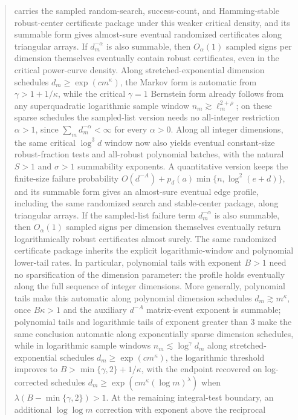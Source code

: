 \documentclass[11pt]{amsart}
\numberwithin{equation}{section}
\theoremstyle{definition}
\theoremstyle{remark}
\begin{document}
\begin{abstract}
carries the sampled random-search, success-count, and Hamming-stable
robust-center certificate package under this weaker critical density, and its
summable form gives almost-sure eventual randomized certificates along triangular
arrays.  If \(d_m^{-\alpha}\) is also summable, then \(O_\alpha(1)\) sampled
signs per dimension themselves eventually contain robust certificates, even in
the critical power-curve density.  Along stretched-exponential dimension
schedules \(d_m\ge\exp(c m^\kappa)\),
the Markov form is automatic from \(\gamma>1+1/\kappa\), while the critical
\(\gamma=1\) Bernstein form already follows from any superquadratic logarithmic
sample window \(n_m\gtrsim \ell_m^{2+\rho}\); on these sparse schedules the
sampled-list version needs no all-integer restriction \(\alpha>1\), since
\(\sum_m d_m^{-\alpha}<\infty\) for every \(\alpha>0\).  Along all integer
dimensions, the same critical \(\log^3 d\) window now also yields eventual
constant-size robust-fraction tests and all-robust polynomial batches, with the
natural \(S>1\) and \(\sigma>1\) summability exponents.  A quantitative version keeps the finite-size
failure probability \(O(d^{-A})+p_d(a)\min\{n,\log^2(e+d)\}\), and its summable
form gives an almost-sure eventual edge profile, including the same randomized
search and stable-center package, along triangular arrays.  If the sampled-list
failure term \(d_m^{-\alpha}\) is also summable, then \(O_\alpha(1)\) sampled
signs per dimension themselves eventually return logarithmically robust
certificates almost surely.  The same randomized certificate package inherits
the explicit logarithmic-window and polynomial lower-tail rates.  In particular,
polynomial tails with exponent \(B>1\) need no sparsification of the dimension
parameter: the profile holds eventually along the full sequence of integer
dimensions.  More generally, polynomial tails make this automatic along
polynomial dimension schedules \(d_m\gtrsim m^\kappa\), once \(B\kappa>1\) and
the auxiliary \(d^{-A}\) matrix-event exponent is summable; polynomial tails and
logarithmic tails of exponent greater than \(3\) make the same conclusion automatic along
exponentially sparse dimension schedules, while in
logarithmic sample windows \(n_m\lesssim\log^\gamma d_m\) along
stretched-exponential schedules \(d_m\ge \exp(c m^\kappa)\), the logarithmic
threshold improves to \(B>\min\{\gamma,2\}+1/\kappa\), with the endpoint
recovered on log-corrected schedules
\(d_m\ge\exp(c m^\kappa(\log m)^\lambda)\) when
\(\lambda(B-\min\{\gamma,2\})>1\).  At the remaining integral-test boundary,
an additional \(\log\log m\) correction with exponent above the reciprocal

\end{abstract}
\end{document}
